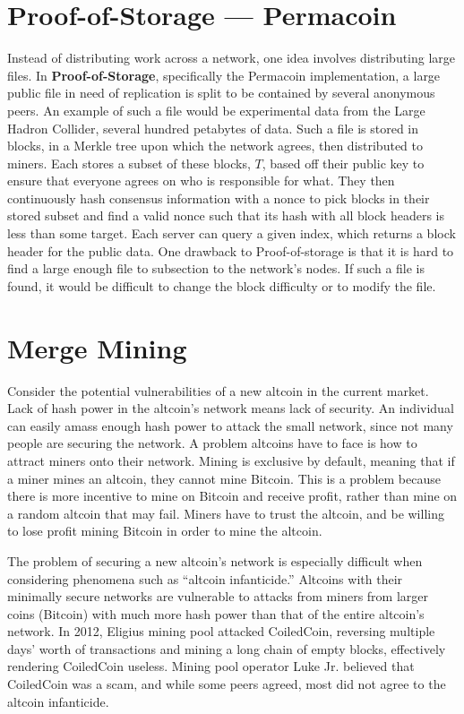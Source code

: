 \documentclass[full.tex]{subfiles}
\begin{document}
    \section*{Proof-of-Storage --- Permacoin}
    
    Instead of distributing work across a network, one idea involves distributing large files. In \textbf{Proof-of-Storage}, specifically the Permacoin implementation, a large public file in need of replication is split to be contained by several anonymous peers. An example of such a file would be experimental data from the Large Hadron Collider, several hundred petabytes of data. Such a file is stored in blocks, in a Merkle tree upon which the network agrees, then distributed to miners. Each stores a subset of these blocks, $T$, based off their public key to ensure that everyone agrees on who is responsible for what. They then continuously hash consensus information with a nonce to pick blocks in their stored subset and find a valid nonce such that its hash with all block headers is less than some target. Each server can query a given index, which returns a block header for the public data. One drawback to Proof-of-storage is that it is hard to find a large enough file to subsection to the network's nodes. If such a file is found, it would be difficult to change the block difficulty or to modify the file.
    
    \section*{Merge Mining}
    
    Consider the potential vulnerabilities of a new altcoin in the current market. Lack of hash power in the altcoin's network means lack of security. An individual can easily amass enough hash power to attack the small network, since not many people are securing the network. A problem altcoins have to face is how to attract miners onto their network. Mining is exclusive by default, meaning that if a miner mines an altcoin, they cannot mine Bitcoin. This is a problem because there is more incentive to mine on Bitcoin and receive profit, rather than mine on a random altcoin that may fail. Miners have to trust the altcoin, and be willing to lose profit mining Bitcoin in order to mine the altcoin.
    
    The problem of securing a new altcoin's network is especially difficult when considering phenomena such as ``altcoin infanticide.'' Altcoins with their minimally secure networks are vulnerable to attacks from miners from larger coins (Bitcoin) with much more hash power than that of the entire altcoin's network. In 2012, Eligius mining pool attacked CoiledCoin, reversing multiple days' worth of transactions and mining a long chain of empty blocks, effectively rendering CoiledCoin useless. Mining pool operator Luke Jr. believed that CoiledCoin was a scam, and while some peers agreed, most did not agree to the altcoin infanticide.
    
\end{document}
